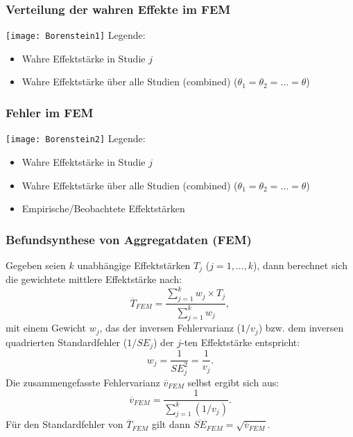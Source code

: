\begin{frame}
  \frametitle{Verteilung der wahren Effekte im FEM}
  \texttt{[image: Borenstein1]}
  \newline
  Legende:
  \begin{itemize}
  \item[\FilledSmallCircle] Wahre Effektstärke in Studie $j$
  \item[\FilledSmallTriangleDown] Wahre Effektstärke über alle Studien
    (combined) ($\theta_1 = \theta_2 = \ldots = \theta$)
  \end{itemize}
  \citep[Quelle: ][64]{borenstein_introduction_2009}
\end{frame}


\begin{frame}[shrink = 5]
  \frametitle{Fehler im FEM}
  \texttt{[image: Borenstein2]}
  \newline
  Legende:
  \begin{itemize}
  \item[\FilledSmallCircle] Wahre Effektstärke in Studie $j$
  \item[\FilledSmallTriangleDown] Wahre Effektstärke über alle Studien
    (combined) ($\theta_1 = \theta_2 = \ldots = \theta$)
  \item[\FilledSmallSquare] Empirische/Beobachtete Effektstärken
  \end{itemize}
  \citep[Quelle: ][64]{borenstein_introduction_2009}
\end{frame}


\begin{frame}[shrink = 5]
  \frametitle{Befundsynthese von Aggregatdaten (FEM)}
  Gegeben seien $k$ unabhängige Effektstärken $T_j$ ($j = 1, \ldots,k$), dann
  berechnet sich die gewichtete mittlere Effektstärke nach:
  \begin{equation}
    \overline{T}_{FEM} = \frac{\sum\limits^k_{j=1}{w_j \times T_j}}{\sum\limits^k_{j=1}{w_j}},
  \end{equation}
  mit einem Gewicht $w_j$, das der inversen Fehlervarianz ($1/v_j$) bzw. dem
  inversen quadrierten Standardfehler ($1/SE_j$) der $j$-ten Effektstärke
  entspricht:
  \begin{equation}
    w_j=\frac{1}{SE^2_j} = \frac{1}{v_j}.
  \end{equation}
  Die zusammengefasste Fehlervarianz $\overline{v}_{FEM}$ selbst ergibt sich
  aus:
  \begin{equation}
    \overline{v}_{FEM}=\frac{1}{\sum\limits^k_{j=1}(1/v_j)}.
  \end{equation}
  Für den Standardfehler von $\overline{T}_{FEM}$ gilt dann $\overline{SE}_{FEM}
  = \sqrt{\overline{v}_{FEM}}$.
\end{frame}



